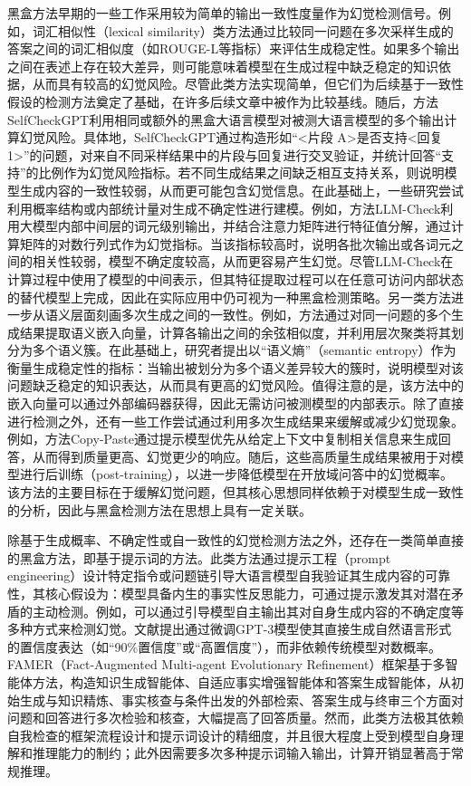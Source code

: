 黑盒方法早期的一些工作采用较为简单的输出一致性度量作为幻觉检测信号。例如，词汇相似性（lexical similarity）类方法通过比较同一问题在多次采样生成的答案之间的词汇相似度（如ROUGE-L\cite{lin2004rouge}等指标）来评估生成稳定性。如果多个输出之间在表述上存在较大差异，则可能意味着模型在生成过程中缺乏稳定的知识依据，从而具有较高的幻觉风险。尽管此类方法实现简单，但它们为后续基于一致性假设的检测方法奠定了基础，在许多后续文章\cite{manakul2023selfcheckgpt}中被作为比较基线。随后，方法SelfCheckGPT\cite{manakul2023selfcheckgpt}利用相同或额外的黑盒大语言模型对被测大语言模型的多个输出计算幻觉风险。具体地，SelfCheckGPT通过构造形如“<片段 A>是否支持<回复 1>”的问题，对来自不同采样结果中的片段与回复进行交叉验证，并统计回答“支持”的比例作为幻觉风险指标。若不同生成结果之间缺乏相互支持关系，则说明模型生成内容的一致性较弱，从而更可能包含幻觉信息。在此基础上，一些研究尝试利用概率结构或内部统计量对生成不确定性进行建模。例如，方法LLM-Check\cite{sriramanan2024llm}利用大模型内部中间层的词元级别输出，并结合注意力矩阵进行特征值分解，通过计算矩阵的对数行列式作为幻觉指标。当该指标较高时，说明各批次输出或各词元之间的相关性较弱，模型不确定度较高，从而更容易产生幻觉。尽管LLM-Check在计算过程中使用了模型的中间表示，但其特征提取过程可以在任意可访问内部状态的替代模型上完成，因此在实际应用中仍可视为一种黑盒检测策略。另一类方法进一步从语义层面刻画多次生成之间的一致性。例如，方法通过对同一问题的多个生成结果提取语义嵌入向量，计算各输出之间的余弦相似度，并利用层次聚类将其划分为多个语义簇。在此基础上，研究者提出以“语义熵”（semantic entropy）作为衡量生成稳定性的指标：当输出被划分为多个语义差异较大的簇时，说明模型对该问题缺乏稳定的知识表达，从而具有更高的幻觉风险。值得注意的是，该方法中的嵌入向量可以通过外部编码器获得，因此无需访问被测模型的内部表示。除了直接进行检测之外，还有一些工作尝试通过利用多次生成结果来缓解或减少幻觉现象。例如，方法Copy-Paste\cite{long2025copy}通过提示模型优先从给定上下文中复制相关信息来生成回答，从而得到质量更高、幻觉更少的响应。随后，这些高质量生成结果被用于对模型进行后训练（post-training），以进一步降低模型在开放域问答中的幻觉概率。该方法的主要目标在于缓解幻觉问题，但其核心思想同样依赖于对模型生成一致性的分析，因此与黑盒检测方法在思想上具有一定关联。

除基于生成概率、不确定性或自一致性的幻觉检测方法之外，还存在一类简单直接的黑盒方法，即基于提示词的方法。此类方法通过提示工程（prompt engineering）设计特定指令或问题链引导大语言模型自我验证其生成内容的可靠性，其核心假设为：模型具备内生的事实性反思能力，可通过提示激发其对潜在矛盾的主动检测。例如，可以通过引导模型自主输出其对自身生成内容的不确定度等多种方式来检测幻觉。文献提出通过微调GPT-3模型使其直接生成自然语言形式的置信度表达（如“90\%置信度”或“高置信度”），而非依赖传统模型对数概率。FAMER（Fact-Augmented Multi-agent Evolutionary Refinement）框架\cite{贺2025基于}基于多智能体方法，构造知识生成智能体、自适应事实增强智能体和答案生成智能体，从初始生成与知识精炼、事实核查与条件出发的外部检索、答案生成与终审三个方面对问题和回答进行多次检验和核查，大幅提高了回答质量。然而，此类方法极其依赖自我检查的框架流程设计和提示词设计的精细度，并且很大程度上受到模型自身理解和推理能力的制约；此外因需要多次多种提示词输入输出，计算开销显著高于常规推理。

